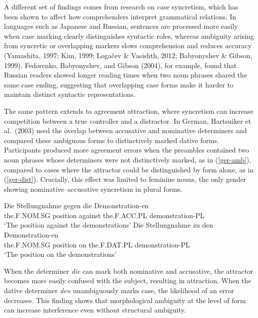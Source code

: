 \documentclass[
  authoryear,
  preprint]{elsarticle}
\begin{document}
A different set of findings comes from research on case syncretism,
which has been shown to affect how comprehenders interpret grammatical
relations. In languages such as Japanese and Russian, sentences are
processed more easily when case marking clearly distinguishes syntactic
roles, whereas ambiguity arising from syncretic or overlapping markers
slows comprehension and reduces accuracy (Yamashita, 1997; Kim, 1999;
Logačev \& Vasishth, 2012; Babyonyshev \& Gibson, 1999). Fedorenko,
Babyonyshev, and Gibson (2004), for example, found that Russian readers
showed longer reading times when two noun phrases shared the same case
ending, suggesting that overlapping case forms make it harder to
maintain distinct syntactic representations.

The same pattern extends to agreement attraction, where syncretism can
increase competition between a true controller and a distractor. In
German, Hartsuiker et al.~(2003) used the overlap between accusative and
nominative determiners and compared these ambiguous forms to
distinctively marked dative forms. Participants produced more agreement
errors when the preambles contained two noun phrases whose determiners
were not distinctively marked, as in (\ref{ger-amb}), compared to cases
where the attractor could be distinguished by form alone, as in
(\ref{ger-dist}). Crucially, this effect was limited to feminine nouns,
the only gender showing nominative--accusative syncretism in plural
forms.

\begin{exe}
\ex \label{ger}
\begin{xlist}
\ex \label{ger-amb}
\gll Die Stellungnahme gegen die Demonstration-en\\
the.F.NOM.SG position against the.F.ACC.PL demonstration-PL\\
\glt `The position against the demonstrations'
\ex \label{ger-dist}
\gll Die Stellungnahme zu den Demonstration-en\\
the.F.NOM.SG position on the.F.DAT.PL demonstration-PL\\
\glt `The position on the demonstrations'
\end{xlist}
\end{exe}

When the determiner \emph{die} can mark both nominative and accusative,
the attractor becomes more easily confused with the subject, resulting
in attraction. When the dative determiner \emph{den} unambiguously marks
case, the likelihood of an error decreases. This finding shows that
morphological ambiguity at the level of form can increase interference
even without structural ambiguity.
\end{document}
